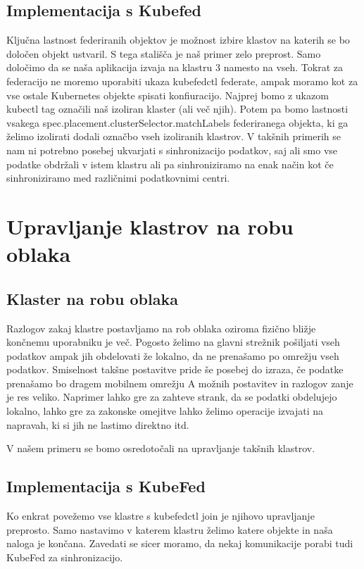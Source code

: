 \documentclass[a4paper, 12pt]{book}
\begin{document}
\section{Implementacija s Kubefed}
Ključna lastnost federiranih objektov je možnost izbire klastov na katerih se bo določen objekt ustvaril. 
S tega stališča je naš primer zelo preprost.
Samo določimo da se naša aplikacija izvaja na klastru 3 namesto na vseh.
Tokrat za federacijo ne moremo uporabiti ukaza kubefedctl federate, ampak moramo kot za vse ostale Kubernetes objekte spisati konfiuracijo.
Najprej bomo z ukazom kubectl tag označili naš izoliran klaster (ali več njih).
Potem pa bomo lastnosti vsakega spec.placement.clusterSelector.matchLabels federiranega objekta, ki ga želimo izolirati dodali označbo vseh izoliranih klastrov.
V takšnih primerih se nam ni potrebno posebej ukvarjati s sinhronizacijo podatkov, saj ali smo vse podatke obdržali v istem klastru ali pa sinhroniziramo na enak način kot če sinhroniziramo med različnimi podatkovnimi centri.
\chapter{Upravljanje klastrov na robu oblaka}
\section{Klaster na robu oblaka}
Razlogov zakaj klastre postavljamo na rob oblaka oziroma fizično bližje končnemu uporabniku je več.
Pogosto želimo na glavni strežnik pošiljati vseh podatkov ampak jih obdelovati že lokalno, da ne prenašamo po omrežju vseh podatkov.
Smiselnost takšne postavitve pride še posebej do izraza, če podatke prenašamo bo dragem mobilnem omrežju
A možnih postavitev in razlogov zanje je res veliko.
Naprimer lahko gre za zahteve strank, da se podatki obdelujejo lokalno, lahko gre za zakonske omejitve lahko želimo operacije izvajati na napravah, ki si jih ne lastimo direktno itd.

V našem primeru se bomo osredotočali na upravljanje takšnih klastrov.

\section{Implementacija s KubeFed}
Ko enkrat povežemo vse klastre s kubefedctl join je njihovo upravljanje preprosto.
Samo nastavimo v katerem klastru želimo katere objekte in naša naloga je končana.
Zavedati se sicer moramo, da nekaj komunikacije porabi tudi KubeFed za sinhronizacijo.
\end{document}
